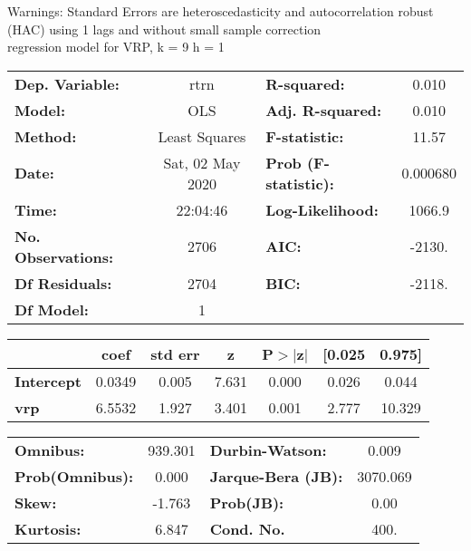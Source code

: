 Warnings: \newline
 [1] Standard Errors are heteroscedasticity and autocorrelation robust (HAC) using 1 lags and without small sample correction\\ 

regression model for VRP, k = 9 h = 1\begin{center}
\begin{tabular}{lclc}
\toprule
\textbf{Dep. Variable:}    &       rtrn       & \textbf{  R-squared:         } &     0.010   \\
\textbf{Model:}            &       OLS        & \textbf{  Adj. R-squared:    } &     0.010   \\
\textbf{Method:}           &  Least Squares   & \textbf{  F-statistic:       } &     11.57   \\
\textbf{Date:}             & Sat, 02 May 2020 & \textbf{  Prob (F-statistic):} &  0.000680   \\
\textbf{Time:}             &     22:04:46     & \textbf{  Log-Likelihood:    } &    1066.9   \\
\textbf{No. Observations:} &        2706      & \textbf{  AIC:               } &    -2130.   \\
\textbf{Df Residuals:}     &        2704      & \textbf{  BIC:               } &    -2118.   \\
\textbf{Df Model:}         &           1      & \textbf{                     } &             \\
\bottomrule
\end{tabular}
\begin{tabular}{lcccccc}
                   & \textbf{coef} & \textbf{std err} & \textbf{z} & \textbf{P$> |$z$|$} & \textbf{[0.025} & \textbf{0.975]}  \\
\midrule
\textbf{Intercept} &       0.0349  &        0.005     &     7.631  &         0.000        &        0.026    &        0.044     \\
\textbf{vrp}       &       6.5532  &        1.927     &     3.401  &         0.001        &        2.777    &       10.329     \\
\bottomrule
\end{tabular}
\begin{tabular}{lclc}
\textbf{Omnibus:}       & 939.301 & \textbf{  Durbin-Watson:     } &    0.009  \\
\textbf{Prob(Omnibus):} &   0.000 & \textbf{  Jarque-Bera (JB):  } & 3070.069  \\
\textbf{Skew:}          &  -1.763 & \textbf{  Prob(JB):          } &     0.00  \\
\textbf{Kurtosis:}      &   6.847 & \textbf{  Cond. No.          } &     400.  \\
\bottomrule
\end{tabular}
\end{center}

